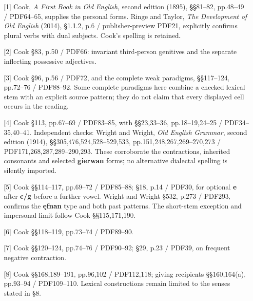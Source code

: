 \begingroup\fontsize{10}{12.8}\selectfont
[1] Cook, \emph{A First Book in Old English}, second edition (1895), §§81–82, pp.48–49 /\allowbreak{} PDF64–65, supplies the personal forms. Ringe and Taylor, \emph{The Development of Old English} (2014), §1.1.2, p.6 /\allowbreak{} publisher-preview PDF21, explicitly confirms plural verbs with dual subjects. Cook’s spelling is retained.

[2] Cook §83, p.50 /\allowbreak{} PDF66: invariant third-person genitives and the separate inflecting possessive adjectives.

[3] Cook §96, p.56 /\allowbreak{} PDF72, and the complete weak paradigms, §§117–124, pp.72–76 /\allowbreak{} PDF88–92. Some complete paradigms here combine a checked lexical stem with an explicit source pattern; they do not claim that every displayed cell occurs in the reading.

[4] Cook §113, pp.67–69 /\allowbreak{} PDF83–85, with §§23,33–36, pp.18–19,24–25 /\allowbreak{} PDF34–35,40–41. Independent checks: Wright and Wright, \emph{Old English Grammar}, second edition (1914), §§305,476,524,528–529,533, pp.151,248,267,269–270,273 /\allowbreak{} PDF171,268,287,289–290,293. These corroborate the contractions, inherited consonants and selected \textbf{gierwan} forms; no alternative dialectal spelling is silently imported.

[5] Cook §§114–117, pp.69–72 /\allowbreak{} PDF85–88; §18, p.14 /\allowbreak{} PDF30, for optional \textbf{e} after \textbf{c/\allowbreak{}g} before a further vowel. Wright and Wright §532, p.273 /\allowbreak{} PDF293, confirms the \textbf{ęfnan} type and both past patterns. The short-stem exception and impersonal limit follow Cook §§115,171,190.

[6] Cook §§118–119, pp.73–74 /\allowbreak{} PDF89–90.

[7] Cook §§120–124, pp.74–76 /\allowbreak{} PDF90–92; §29, p.23 /\allowbreak{} PDF39, on frequent negative contraction.

[8] Cook §§168,189–191, pp.96,102 /\allowbreak{} PDF112,118; giving recipients §§160,164(a), pp.93–94 /\allowbreak{} PDF109–110. Lexical constructions remain limited to the senses stated in §8.

